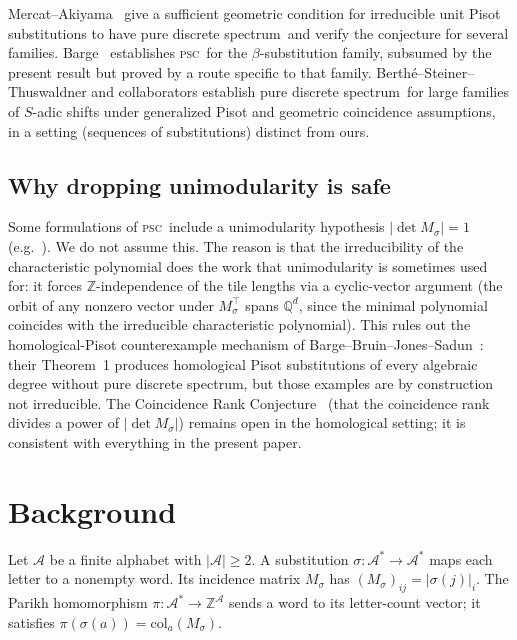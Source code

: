 \documentclass[11pt]{article}
\theoremstyle{plain}
\theoremstyle{definition}
\theoremstyle{remark}
\newcommand{\PSC}{\textsc{psc}}
\newcommand{\PDS}{pure discrete spectrum}
\newcommand{\Z}{\mathbb{Z}}
\newcommand{\Q}{\mathbb{Q}}
\newcommand{\A}{\mathcal{A}}
\begin{document}
Mercat--Akiyama~\cite{MA} give a sufficient geometric condition for irreducible unit Pisot substitutions to have \PDS\ and verify the conjecture for several families. Barge~\cite{Barge2018} establishes \PSC\ for the $\beta$-substitution family, subsumed by the present result but proved by a route specific to that family. Berth\'e--Steiner--Thuswaldner and collaborators establish \PDS\ for large families of $S$-adic shifts under generalized Pisot and geometric coincidence assumptions, in a setting (sequences of substitutions) distinct from ours.

\subsection{Why dropping unimodularity is safe}\label{sec:nonunimodular}

Some formulations of \PSC\ include a unimodularity hypothesis $|\det M_\sigma|=1$ (e.g.~\cite{BBJS}). We do not assume this. The reason is that the irreducibility of the characteristic polynomial does the work that unimodularity is sometimes used for: it forces $\Z$-independence of the tile lengths via a cyclic-vector argument (the orbit of any nonzero vector under $M_\sigma^\top$ spans $\Q^d$, since the minimal polynomial coincides with the irreducible characteristic polynomial). This rules out the homological-Pisot counterexample mechanism of Barge--Bruin--Jones--Sadun~\cite{BBJS}: their Theorem~1 produces homological Pisot substitutions of every algebraic degree without \PDS, but those examples are by construction not irreducible. The Coincidence Rank Conjecture~\cite{BBJS} (that the coincidence rank divides a power of $|\det M_\sigma|$) remains open in the homological setting; it is consistent with everything in the present paper.

\section{Background}\label{sec:background}

Let $\A$ be a finite alphabet with $|\A|\ge 2$. A substitution $\sigma:\A^*\to\A^*$ maps each letter to a nonempty word. Its incidence matrix $M_\sigma$ has $(M_\sigma)_{ij}=|\sigma(j)|_i$. The Parikh homomorphism $\pi:\A^*\to\Z^\A$ sends a word to its letter-count vector; it satisfies $\pi(\sigma(a))=\mathrm{col}_a(M_\sigma)$.
\end{document}
